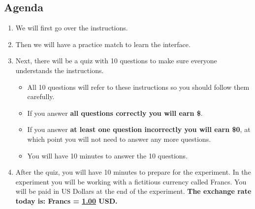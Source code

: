 \documentclass[11pt]{article}
\newcommand{\dblbkt}[1]{}
\begin{document}
\subsection*{\dblbkt{3} Agenda}
\begin{enumerate} 
\dblbkt{1} \item We will first go over the instructions.
\dblbkt{1} \item Then we will have a practice match to learn the interface. 
\dblbkt{1} \item Next, there will be a quiz with 10 questions to make sure everyone understands the instructions. \dblbkt{slnc 1000}
\begin{itemize}
\dblbkt{1} \item All 10 questions will refer to these instructions so you should follow them carefully.
\dblbkt{1} \item If you answer {\bf all questions correctly you will earn \$\quizMaxTotal}. \dblbkt{slnc 1000}  
\dblbkt{1} \item If you answer {\bf at least one question incorrectly you will earn \$0}, at which point you will not need to answer any more questions. \dblbkt{slnc 1000}
\dblbkt{1} \item You will have 10 minutes to answer the 10 questions.
\end{itemize} 
\dblbkt{1} \item After the quiz, you will have 10 minutes to prepare for the experiment. \dblbkt{3} In the experiment you will be working with a fictitious currency called Francs. You will be paid in US Dollars at the end of the experiment. \dblbkt{1}  {\bf The exchange rate today is: \underline{\exchangeRate} Francs = \underline{1.00} USD.} \dblbkt{slnc 4000}
\end{enumerate} 
\end{document}
